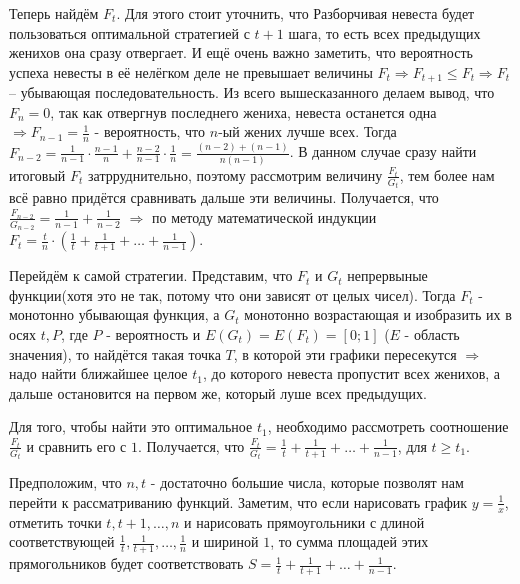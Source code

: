 \documentclass[nobib]{tufte-handout}
\theoremstyle{definition}
\newcounter{problem}
\newenvironment{problem}%
{%
\refstepcounter{problem}%
     \hypertarget{problem:{\theproblem}}{}
     \Writetofile{solution_file}{\protect\hypertarget{soln:\theproblem}{}}
     \begin{myenum}[label=\bfseries\protect\hyperlink{soln:\theproblem}{\theproblem},ref=\theproblem]
     \item%
    }%
    {%
    \end{myenum}}
\begin{document}
\begin{problem}
\begin{sol}
Теперь найдём $F_t$. Для этого стоит уточнить, что Разборчивая невеста будет пользоваться оптимальной стратегией с $t+1$ шага, то есть всех предыдущих женихов она сразу отвергает. И ещё очень важно заметить, что вероятность успеха невесты в её нелёгком деле не превышает величины $F_t \Rightarrow F_{t+1} \le F_t \Rightarrow F_t$ – убывающая последовательность. Из всего вышесказанного делаем вывод, что $F_n = 0$, так как отвергнув последнего жениха, невеста останется одна $\Rightarrow F_{n-1}=\frac{1}{n}$ - вероятность, что $n$-ый жених лучше всех. Тогда $F_{n-2}=\frac{1}{n-1}\cdot\frac{n-1}{n}+\frac{n-2}{n-1}\cdot\frac{1}{n}=\frac{(n-2)+(n-1)}{n(n-1)}$. В данном случае сразу найти итоговый $F_t$ затрруднительно, поэтому рассмотрим величину $\frac{F_t}{G_t}$, тем более нам всё равно придётся сравнивать дальше эти величины. Получается, что $\frac{F_{n-2}}{G_{n-2}}=\frac{1}{n-1}+\frac{1}{n-2}$ $\Rightarrow$ по методу математической индукции $F_t = \frac{t}{n} \cdot (\frac{1}{t}+\frac{1}{t+1}+\ldots +\frac{1}{n-1})$.

Перейдём к самой стратегии. Представим, что $F_t$ и $G_t$ непрервыные функции(хотя это не так, потому что они зависят от целых чисел). Тогда $F_t$ - монотонно убывающая функция, а $G_t$ монотонно возрастающая и изобразить их в осях $t, P$, где $P$ - вероятность и $E(G_t)=E(F_t)=[0;1]$ ($E$ - область значения), то найдётся такая точка $T$, в которой эти графики пересекутся $\Rightarrow$ надо найти ближайшее целое $t_1$, до которого невеста пропустит всех женихов, а дальше остановится на первом же, который луше всех предыдущих.

Для того, чтобы найти это оптимальное $t_1$, необходимо рассмотреть соотношение $\frac{F_t}{G_t}$ и сравнить его с $1$. Получается, что $\frac{F_t}{G_t}= \frac{1}{t}+\frac{1}{t+1}+\ldots +\frac{1}{n-1}$, для $t \ge t_1$.

Предположим, что $n, t$ - достаточно большие числа, которые позволят нам перейти к рассматриванию функций. Заметим, что если нарисовать график $y=\frac{1}{x}$, отметить точки $t, t+1,\ldots , n$ и нарисовать прямоугольники с длиной соответствующей  $\frac{1}{t}, \frac{1}{t+1},\ldots ,\frac{1}{n}$ и шириной $1$, то сумма площадей этих прямогольников будет соответствовать $S = \frac{1}{t}+\frac{1}{t+1}+\ldots +\frac{1}{n-1}$.


\end{sol}
\end{problem}
\end{document}
